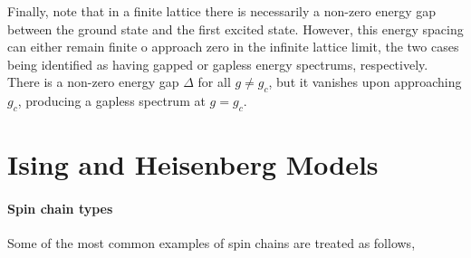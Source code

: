 \documentclass{homework}
\begin{document}
Finally, note that in a finite lattice there is necessarily a non-zero energy gap between the ground state and the first excited state. However, this energy spacing can either remain finite o approach zero in the infinite lattice limit, the two cases being identified as having gapped or gapless energy spectrums, respectively. There is a non-zero energy gap $\Delta$ for all $g \neq g_c$, but it vanishes upon approaching $g_c$, producing a gapless spectrum at $g = g_c$. 

\clearpage

\section{\textbf{Ising and Heisenberg Models}}

\paragraph{\textbf{Spin chain types}}

Some of the most common examples of spin chains are treated as follows, 
\end{document}
